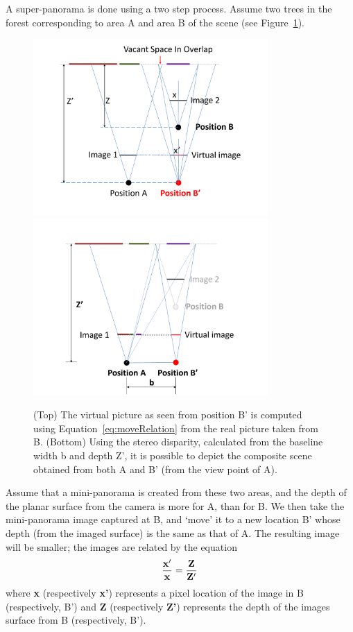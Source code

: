 A super-panorama is done using a two step process. Assume two trees in
the forest corresponding to area A and area B of the scene (see
Figure~\ref{fig:stereo}). 
\begin{figure}[h!]
  \centering
  \includegraphics[width=0.8\textwidth]{figures/vacantSpaces/move} \\
  \includegraphics[width=0.8\textwidth]{figures/vacantSpaces/stereo} 
  \caption[Creation of Super-panoramas]{ \label{fig:stereo} (Top) The virtual
  picture as seen from position B' is computed using Equation~\ref{eq:moveRelation} from the real picture
    taken from B.  (Bottom) Using the stereo disparity, calculated from the baseline 
   width b and depth Z',  it is possible to depict the composite scene obtained from both A
  and B' (from the view point of A).}
\end{figure}    
Assume that a mini-panorama is created from these two areas, and the
depth of the planar surface from the camera is more for A, than for
B. We then take the mini-panorama image captured at B, and `move' it to
a new location B' whose depth (from the imaged surface) is the same as
that of A. The resulting image  will be smaller; the images are
related by the equation
\begin{equation}
  \label{eq:moveRelation}
  {\bf \frac{x'}{x} = \frac{Z}{Z'}}
\end{equation}
where {\bf x} (respectively {\bf x'}) represents a pixel location of
the image in B (respectively, B') and 
{\bf Z} (respectively {\bf Z'}) represents the depth of the images
surface from B (respectively, B').

